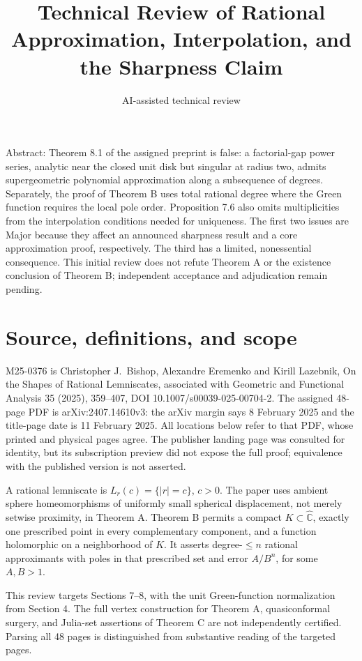 \documentclass[10pt]{article}
\title{Technical Review of Rational Approximation, Interpolation, and the Sharpness Claim}
\author{AI-assisted technical review}
\date{}
\begin{document}
\maketitle
Abstract: Theorem 8.1 of the assigned preprint is false: a factorial-gap power series, analytic near the closed unit disk but singular at radius two, admits supergeometric polynomial approximation along a subsequence of degrees. Separately, the proof of Theorem B uses total rational degree where the Green function requires the local pole order. Proposition 7.6 also omits multiplicities from the interpolation conditions needed for uniqueness. The first two issues are Major because they affect an announced sharpness result and a core approximation proof, respectively. The third has a limited, nonessential consequence. This initial review does not refute Theorem A or the existence conclusion of Theorem B; independent acceptance and adjudication remain pending.\par
\section*{Source, definitions, and scope}
M25-0376 is Christopher J. Bishop, Alexandre Eremenko and Kirill Lazebnik, On the Shapes of Rational Lemniscates, associated with Geometric and Functional Analysis 35 (2025), 359–407, DOI 10.1007/s00039-025-00704-2. The assigned 48-page PDF is arXiv:2407.14610v3: the arXiv margin says 8 February 2025 and the title-page date is 11 February 2025. All locations below refer to that PDF, whose printed and physical pages agree. The publisher landing page was consulted for identity, but its subscription preview did not expose the full proof; equivalence with the published version is not asserted.\par
A rational lemniscate is \(L_r(c)=\{|r|=c\}\), \(c>0\). The paper uses ambient sphere homeomorphisms of uniformly small spherical displacement, not merely setwise proximity, in Theorem A. Theorem B permits a compact \(K\subset\widehat{\mathbb C}\), exactly one prescribed point in every complementary component, and a function holomorphic on a neighborhood of \(K\). It asserts degree-\(\le n\) rational approximants with poles in that prescribed set and error \(A/B^n\), for some \(A,B>1\).\par
This review targets Sections 7–8, with the unit Green-function normalization from Section 4. The full vertex construction for Theorem A, quasiconformal surgery, and Julia-set assertions of Theorem C are not independently certified. Parsing all 48 pages is distinguished from substantive reading of the targeted pages.\par
\end{document}
